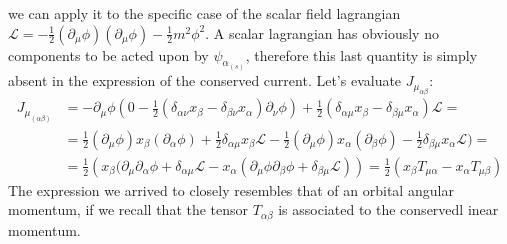 \documentclass[class=article]{standalone}
\begin{document}
we can apply it to the specific case of the scalar field lagrangian $\mathcal{L}=-\frac{1}{2}(\partial_{\mu}\phi)(\partial_{\mu}\phi)-\frac{1}{2}m^2\phi^2$. A scalar lagrangian has obviously no components to be acted upon by $\psi_{\alpha_{(s)}}$, therefore this last quantity is simply absent in the expression of the conserved current. Let's evaluate $J_{\mu_{\alpha\beta}}$:
\begin{align*}
J_{\mu_{(\alpha\beta)}}&=-\partial_{\mu}\phi\left(0-\frac{1}{2}\left(\delta_{\alpha\nu}x_{\beta}-\delta_{\beta\nu}x_{\alpha}\right)\partial_{\nu}\phi\right)+\frac{1}{2}\left(\delta_{\alpha\mu}x_{\beta}-\delta_{\beta\mu}x_{\alpha}\right)\mathcal{L}=\\
&=\frac{1}{2}(\partial_{\mu}\phi)x_{\beta}(\partial_{\alpha}\phi)+\frac{1}{2}\delta_{\alpha\mu}x_{\beta}\mathcal{L}-\frac{1}{2}(\partial_{\mu}\phi)x_{\alpha}(\partial_{\beta}\phi)-\frac{1}{2}\delta_{\beta\mu}x_{\alpha}\mathcal{L})=\\
&=\frac{1}{2}\left(x_{\beta}(\partial_{\mu}\partial_{\alpha}\phi+\delta_{\alpha\mu}\mathcal{L}-x_{\alpha}(\partial_{\mu}\phi\partial_{\beta}\phi+\delta_{\beta\mu}\mathcal{L})\right)=\frac{1}{2}(x_{\beta}T_{\mu\alpha}-x_{\alpha}T_{\mu\beta})
\end{align*}
The expression we arrived to closely resembles that of an orbital angular momentum, if we recall that the tensor $T_{\alpha\beta}$ is associated to the conservedl inear momentum.
\end{document}
